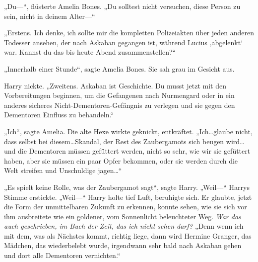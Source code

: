 „Du—“, flüsterte Amelia Bones. „Du solltest nicht versuchen, diese Person zu sein, nicht in deinem Alter—“

„Erstens. Ich denke, ich sollte mir die kompletten Polizeiakten über jeden anderen Todesser ansehen, der nach Askaban gegangen ist, während Lucius ‚abgelenkt‘ war. Kannst du das bis heute Abend zusammenstellen?“

„Innerhalb einer Stunde“, sagte Amelia Bones. Sie sah grau im Gesicht aus.

Harry nickte.
„Zweitens. Askaban ist Geschichte. Du musst jetzt mit den Vorbereitungen beginnen, um die Gefangenen nach Nurmengard oder in ein anderes sicheres Nicht-Dementoren-Gefängnis zu verlegen und sie gegen den Dementoren Einfluss zu behandeln.“

„Ich“, sagte Amelia. Die alte Hexe wirkte geknickt, entkräftet. „Ich…glaube nicht, dass selbst bei diesem…Skandal, der Rest des Zaubergamots sich beugen wird…und die Dementoren müssen gefüttert werden, nicht so sehr, wie wir sie gefüttert haben, aber sie müssen ein paar Opfer bekommen, oder sie werden durch die Welt streifen und Unschuldige jagen…“

„Es spielt keine Rolle, was der Zaubergamot sagt“, sagte Harry. „Weil—“
Harrys Stimme erstickte.
„Weil—“
Harry holte tief Luft, beruhigte sich. Er glaubte, jetzt die Form der unmittelbaren Zukunft zu erkennen, konnte sehen, wie sie sich vor ihm ausbreitete wie ein goldener, vom Sonnenlicht beleuchteter Weg.
\emph{War das auch geschrieben, im Buch der Zeit, das ich nicht sehen darf?}
„Denn wenn ich mit dem, was als Nächstes kommt, richtig liege, dann wird Hermine Granger, das Mädchen, das wiederbelebt wurde, irgendwann sehr bald nach Askaban gehen und dort alle Dementoren vernichten.“


